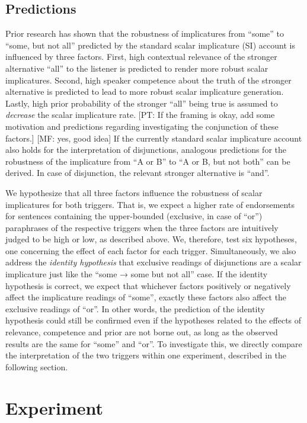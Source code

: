 \documentclass{sp}
\newcommand{\mf}[1]{\textcolor{BurntOrange}{[MF: #1]}}
\newcommand{\pt}[1]{\textcolor{Cerulean}{[PT: #1]}}
\begin{document}
\subsection{Predictions}
Prior research has shown that the robustness of implicatures from ``some'' to ``some, but not all''  predicted by the standard scalar implicature (SI) account is influenced by three factors. First, high contextual relevance of the stronger alternative ``all'' to the listener is predicted to render more robust scalar implicatures. Second, high speaker competence about the truth of the stronger alternative is predicted to lead to more robust scalar implicature generation. Lastly, high prior probability of the stronger ``all'' being true is assumed to \textit{decrease} the scalar implicature rate. \pt{If the framing is okay, add some motivation and predictions regarding investigating the conjunction of these factors.} \mf{yes, good idea}
If the currently standard scalar implicature account also holds for the interpretation of disjunctions, analogous predictions for the robustness of the implicature from ``A or B'' to ``A or B, but not both'' can be derived. In case of disjunction, the relevant stronger alternative is ``and''.

We hypothesize that all three factors influence the robustness of scalar implicatures for both triggers. That is, we expect a higher rate of endorsements for sentences containing the upper-bounded (exclusive, in case of ``or'') paraphrases of the respective triggers when the three factors are intuitively judged to be high or low, as described above. We, therefore, test six hypotheses, one concerning the effect of each factor for each trigger. 
Simultaneously,  we also address the \textit{identity hypothesis} that exclusive readings of disjunctions are a scalar implicature just like the ``some → some but not all'' case. If the identity hypothesis is correct, we expect that whichever factors positively or negatively affect the implicature readings of ``some'', exactly these factors also affect the exclusive readings of ``or''. In other words, the prediction of the identity hypothesis could still be confirmed even if the hypotheses related to the effects of relevance, competence and prior are not borne out, as long as the observed results are the same for ``some'' and ``or''. To investigate this, we directly compare the interpretation of the two triggers within one experiment, described in the following section.

\section{Experiment}
\end{document}
